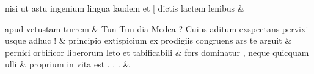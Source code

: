 \documentclass[12pt,onecolumn,twoside,a4paper]{memoir}
\begin{document}
\begin{pairs}
\begin{Leftside}
                              nisi
                              ut
                              astu
                              ingenium
                              lingua
                              laudem
                              et
                              [
                              dictis
                              lactem
                              lenibus \&
                         \stanza {}
                     
                              apud
                              vetustam
                              turrem \&
                         \stanza {}
                     Tun
                              {Tun}
                              dia
                              Medea
                              ?
                              Cuius
                              aditum
                              exspectans
                              pervixi
                              usque
                              adhuc
                              ! \&
                         \stanza {}
                     principio
                              extispicium
                              ex
                              prodigiis
                              congruens
                              ars
                              te
                              arguit \&
                         \stanza {}
                     pernici
                              orbificor
                              liberorum
                              leto
                              et
                              tabificabili \&
                         \stanza {}fors
                              dominatur
                              ,
                              neque
                              quicquam
                              ulli & 
                     proprium
                              in
                              vita
                              est
                              .
                              .
                              . \&
                     

\end{Leftside}
\end{pairs}
\end{document}
